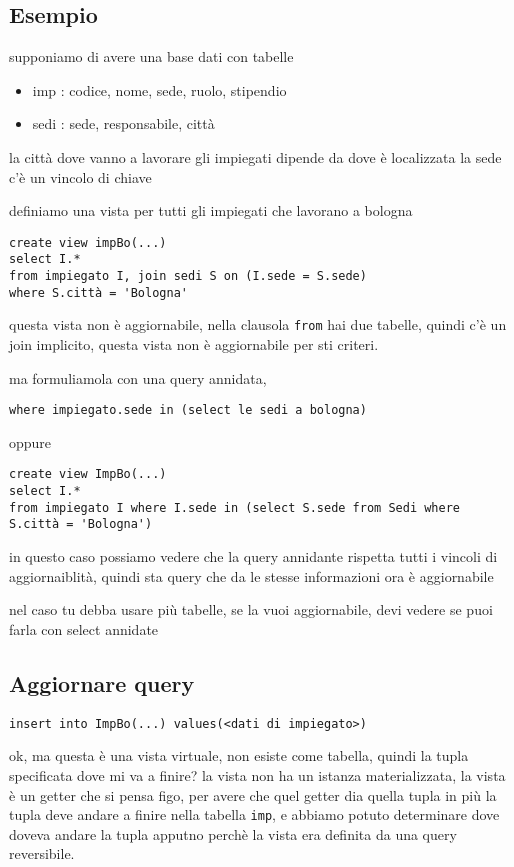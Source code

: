 \documentclass[11pt]{article}
\begin{document}
\subsection{Esempio}
\label{sec:org1e7e039}
supponiamo di avere una base dati con tabelle   
\begin{itemize}
\item imp : codice, nome, sede, ruolo, stipendio
\item sedi : sede, responsabile, città
\end{itemize}

la città dove vanno a lavorare gli impiegati dipende da dove è localizzata la sede
c'è un vincolo di chiave

definiamo una vista per tutti gli impiegati che lavorano a bologna
\begin{verbatim}
create view impBo(...)
select I.*
from impiegato I, join sedi S on (I.sede = S.sede)
where S.città = 'Bologna'
\end{verbatim}

questa vista non è aggiornabile, nella clausola \texttt{from} hai due tabelle, quindi c'è un join
implicito, questa vista non è aggiornabile per sti criteri.

ma formuliamola con una query annidata,
\begin{verbatim}
where impiegato.sede in (select le sedi a bologna)
\end{verbatim}
oppure
\begin{verbatim}
create view ImpBo(...)
select I.*
from impiegato I where I.sede in (select S.sede from Sedi where S.città = 'Bologna')
\end{verbatim}
in questo caso possiamo vedere che la query annidante rispetta tutti i vincoli di
aggiornaiblità, quindi sta query che da le stesse informazioni ora è aggiornabile

nel caso tu debba usare più tabelle, se la vuoi aggiornabile, devi vedere se puoi farla
con select annidate

\subsection{Aggiornare query}
\label{sec:org6b947d0}
\begin{verbatim}
insert into ImpBo(...) values(<dati di impiegato>)
\end{verbatim}

ok, ma questa è una vista virtuale, non esiste come tabella, quindi la tupla specificata
dove mi va a finire? la vista non ha un istanza materializzata, la vista è un getter che
si pensa figo, per avere che quel getter dia quella tupla in più la tupla deve andare a
finire nella tabella \texttt{imp}, e abbiamo potuto determinare dove doveva andare la tupla
apputno perchè la vista era definita da una query reversibile.
\end{document}
